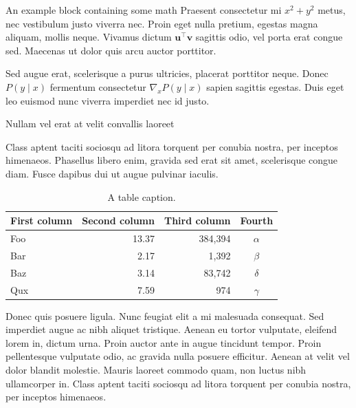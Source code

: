 \documentclass[final]{beamer}
\newlength{\colwidth}
\begin{document}
\begin{frame}[t]
\begin{columns}[t]
\begin{column}{\colwidth}
\begin{exampleblock}{An example block containing some math}{}
        Praesent consectetur mi $x^2 + y^2$ metus, nec vestibulum justo viverra
        nec. Proin eget nulla pretium, egestas magna aliquam, mollis neque. Vivamus
        dictum $\mathbf{u}^\intercal\mathbf{v}$ sagittis odio, vel porta erat
        congue sed. Maecenas ut dolor quis arcu auctor porttitor.


        Sed augue erat, scelerisque a purus ultricies, placerat porttitor neque.
        Donec $P(y \mid x)$ fermentum consectetur $\nabla_x P(y \mid x)$ sapien
        sagittis egestas. Duis eget leo euismod nunc viverra imperdiet nec id
        justo.

      \end{exampleblock}

      \begin{block}{Nullam vel erat at velit convallis laoreet}

        Class aptent taciti sociosqu ad litora torquent per conubia nostra, per
        inceptos himenaeos. Phasellus libero enim, gravida sed erat sit amet,
        scelerisque congue diam. Fusce dapibus dui ut augue pulvinar iaculis.

        \begin{table}
          \centering
          \begin{tabular}{l r r c}
            \toprule
            \textbf{First column} & \textbf{Second column} & \textbf{Third column} & \textbf{Fourth} \\
            \midrule
            Foo & 13.37 & 384,394 & $\alpha$ \\
            Bar & 2.17 & 1,392 & $\beta$ \\
            Baz & 3.14 & 83,742 & $\delta$ \\
            Qux & 7.59 & 974 & $\gamma$ \\
            \bottomrule
          \end{tabular}
          \caption{A table caption.}
        \end{table}

        Donec quis posuere ligula. Nunc feugiat elit a mi malesuada consequat. Sed
        imperdiet augue ac nibh aliquet tristique. Aenean eu tortor vulputate,
        eleifend lorem in, dictum urna. Proin auctor ante in augue tincidunt
        tempor. Proin pellentesque vulputate odio, ac gravida nulla posuere
        efficitur. Aenean at velit vel dolor blandit molestie. Mauris laoreet
        commodo quam, non luctus nibh ullamcorper in. Class aptent taciti sociosqu
        ad litora torquent per conubia nostra, per inceptos himenaeos.


\end{block}
\end{column}
\end{columns}
\end{frame}
\end{document}
